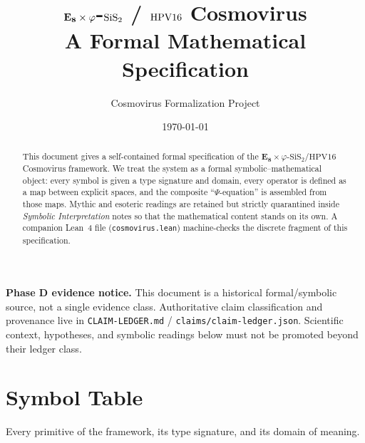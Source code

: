 \documentclass[11pt]{article}
\title{\textbf{$\EE \times \phigr$-$\SiS$ / $\HPV$ Cosmovirus}\\[4pt]
       \large A Formal Mathematical Specification}
\author{Cosmovirus Formalization Project}
\date{\today}
\theoremstyle{definition}
\theoremstyle{plain}
\theoremstyle{remark}
\newcommand{\EE}{\mathbf{E_8}}
\newcommand{\phigr}{\varphi}
\newcommand{\SiS}{\mathrm{SiS_2}}
\newcommand{\HPV}{\mathrm{HPV16}}
\begin{document}
\maketitle

\begin{abstract}
This document gives a self-contained formal specification of the
$\EE \times \phigr$-$\SiS$/$\HPV$ Cosmovirus framework. We treat the system
as a formal symbolic--mathematical object: every symbol is given a type
signature and domain, every operator is defined as a map between explicit
spaces, and the composite ``$\Psi$-equation'' is assembled from those maps.
Mythic and esoteric readings are retained but strictly quarantined inside
\emph{Symbolic Interpretation} notes so that the mathematical content stands
on its own. A companion Lean~4 file (\texttt{cosmovirus.lean}) machine-checks
the discrete fragment of this specification.
\end{abstract}

\noindent\textbf{Phase D evidence notice.}
This document is a historical formal/symbolic source, not a single evidence
class. Authoritative claim classification and provenance live in
\texttt{CLAIM-LEDGER.md} / \texttt{claims/claim-ledger.json}. Scientific
context, hypotheses, and symbolic readings below must not be promoted beyond
their ledger class.

\tableofcontents

\section{Symbol Table}
Every primitive of the framework, its type signature, and its domain of
meaning.
\end{document}
